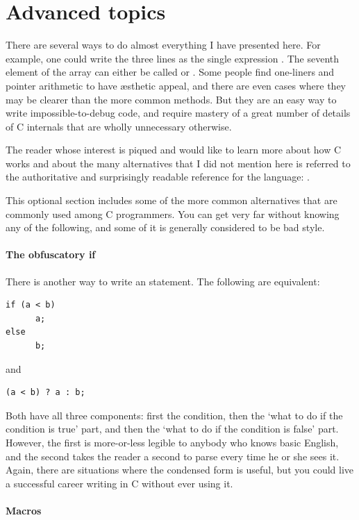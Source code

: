 \documentclass[12pt]{article}
\makeatletter
\def\cind#1{\index{#1@\ci{#1}}\ci{#1}}
\makeatother
\begin{document}
\section{\treesymbol Advanced topics}   
There are several ways to do almost everything I have presented here.  For
example, one could write the three lines  as the single expression . The seventh
element of the array  can either be called  or
.  Some people find one-liners and pointer arithmetic
to have \ae{}sthetic appeal, and there are even cases where they may
be clearer than the more common methods. But they are an easy way to
write impossible-to-debug code, and require mastery of a great number
of details of C internals that are wholly unnecessary otherwise.

The reader whose interest is piqued and would like to learn more about
how C works and about the many alternatives that I did not mention here
is referred to the authoritative and surprisingly readable reference
for the language: \cite{kandr:c}.

This optional section includes some of the more common alternatives that
are commonly used among C programmers. You can get very far without
knowing any of the following, and some of it is generally considered to
be bad style.

\paragraph{The obfuscatory if} There is another way to write an \cind{if} statement. The following are equivalent:
\begin{lstlisting}
if (a < b)
      a;
else
      b;
\end{lstlisting}
and
\begin{lstlisting}
(a < b) ? a : b;
\end{lstlisting}
Both have all three components: first the condition, then the `what to do if the
condition is true' part, and then the `what to do if the condition is false'
part. However, the first is more-or-less legible to anybody who knows basic English,
and the second takes the reader a second to parse every time he or she
sees it. Again, there are situations where the condensed form is useful,
but you could live a successful career writing in C without ever using it.


\paragraph{Macros} \label{macros} 
\end{document}
